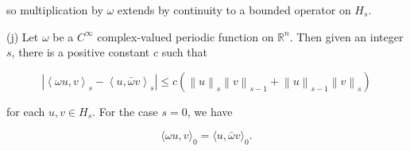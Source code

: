 \begin{theorem}
so multiplication by $\omega$ extends by continuity to a bounded operator on $H_{s}$.

(j) Let $\omega$ be a $C^{\infty}$ complex-valued periodic function on $\mathbb{R}^{n}$. Then given an integer $s$, there is a positive constant $c$ such that

\begin{equation}
\tag{8}\label{eq:6.18:8}
\left|\left\langle\omega u,v\right\rangle_{s}-\left\langle u,\bar{\omega}v\right\rangle_{s}\right|\leq c(\left\|u\right\|_{s}\left\|v\right\|_{s-1}+\left\|u\right\|_{s-1}\left\|v\right\|_{s})
\end{equation}

for each $u, v \in H_{s}$. For the case $s = 0$, we have

\begin{equation}
\tag{9}\label{eq:6.18:9}
\langle\omega u,v\rangle_{0}=\langle u,\bar{\omega}v\rangle_{0}.
\end{equation}

\end{theorem}

